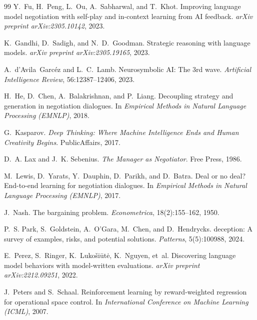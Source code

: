 \documentclass[11pt,a4paper]{article}
\begin{document}
\begin{thebibliography}{99}
Y.~Fu, H.~Peng, L.~Ou, A.~Sabharwal, and T.~Khot.
\newblock Improving language model negotiation with self-play and in-context learning from {AI} feedback.
\newblock \emph{arXiv preprint arXiv:2305.10142}, 2023.

K.~Gandhi, D.~Sadigh, and N.~D.~Goodman.
\newblock Strategic reasoning with language models.
\newblock \emph{arXiv preprint arXiv:2305.19165}, 2023.

A.~d'Avila~Garc{\'e}z and L.~C.~Lamb.
\newblock Neurosymbolic {AI}: The 3rd wave.
\newblock \emph{Artificial Intelligence Review}, 56:12387--12406, 2023.

H.~He, D.~Chen, A.~Balakrishnan, and P.~Liang.
\newblock Decoupling strategy and generation in negotiation dialogues.
\newblock In \emph{Empirical Methods in Natural Language Processing (EMNLP)}, 2018.

G.~Kasparov.
\newblock \emph{Deep Thinking: Where Machine Intelligence Ends and Human Creativity Begins}.
\newblock PublicAffairs, 2017.

D.~A. Lax and J.~K. Sebenius.
\newblock \emph{The Manager as Negotiator}.
\newblock Free Press, 1986.

M.~Lewis, D.~Yarats, Y.~Dauphin, D.~Parikh, and D.~Batra.
\newblock Deal or no deal? End-to-end learning for negotiation dialogues.
\newblock In \emph{Empirical Methods in Natural Language Processing (EMNLP)}, 2017.

J.~Nash.
\newblock The bargaining problem.
\newblock \emph{Econometrica}, 18(2):155--162, 1950.

P.~S. Park, S.~Goldstein, A.~O'Gara, M.~Chen, and D.~Hendrycks.
 deception: A survey of examples, risks, and potential solutions.
\newblock \emph{Patterns}, 5(5):100988, 2024.

E.~Perez, S.~Ringer, K.~Luko\v{s}i\={u}t\.{e}, K.~Nguyen, et~al.
\newblock Discovering language model behaviors with model-written evaluations.
\newblock \emph{arXiv preprint arXiv:2212.09251}, 2022.

J.~Peters and S.~Schaal.
\newblock Reinforcement learning by reward-weighted regression for operational space control.
\newblock In \emph{International Conference on Machine Learning (ICML)}, 2007.


\end{thebibliography}
\end{document}
